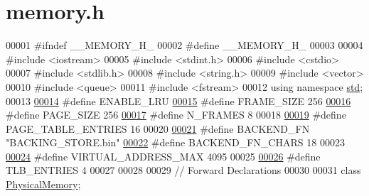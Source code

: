 \hypertarget{memory_8h_source}{}\section{memory.\+h}
\label{memory_8h_source}

\begin{DoxyCode}
00001 \textcolor{preprocessor}{#ifndef \_\_MEMORY\_H\_}
00002 \textcolor{preprocessor}{#define \_\_MEMORY\_H\_}
00003 
00004 \textcolor{preprocessor}{#include <iostream>}
00005 \textcolor{preprocessor}{#include <stdint.h>}
00006 \textcolor{preprocessor}{#include <cstdio>}
00007 \textcolor{preprocessor}{#include <stdlib.h>}
00008 \textcolor{preprocessor}{#include <string.h>}
00009 \textcolor{preprocessor}{#include <vector>}
00010 \textcolor{preprocessor}{#include <queue>}
00011 \textcolor{preprocessor}{#include <fstream>}
00012 \textcolor{keyword}{using namespace }\hyperlink{namespacestd}{std};
00013 
\hypertarget{memory_8h_source.tex_l00014}{}\hyperlink{memory_8h_af6463c112a252cbb29636eef8ae9e6dc}{00014} \textcolor{preprocessor}{#define ENABLE\_LRU}
\hypertarget{memory_8h_source.tex_l00015}{}\hyperlink{memory_8h_af9b1b2ba12857a4bf11289dac8c5462d}{00015} \textcolor{preprocessor}{#define FRAME\_SIZE 256}
\hypertarget{memory_8h_source.tex_l00016}{}\hyperlink{memory_8h_a7d467c1d283fdfa1f2081ba1e0d01b6e}{00016} \textcolor{preprocessor}{#define PAGE\_SIZE 256}
\hypertarget{memory_8h_source.tex_l00017}{}\hyperlink{memory_8h_a0b0ce802de0cae773522024d7626b007}{00017} \textcolor{preprocessor}{#define N\_FRAMES 8}
00018 
\hypertarget{memory_8h_source.tex_l00019}{}\hyperlink{memory_8h_a6fc2e8cefe03a42d0a238bad856a2a8b}{00019} \textcolor{preprocessor}{#define PAGE\_TABLE\_ENTRIES 16}
00020 
\hypertarget{memory_8h_source.tex_l00021}{}\hyperlink{memory_8h_a478707addabe7b0aedaa632b70394d75}{00021} \textcolor{preprocessor}{#define BACKEND\_FN "BACKING\_STORE.bin"}
\hypertarget{memory_8h_source.tex_l00022}{}\hyperlink{memory_8h_a502fddf4e42292e4318a924b6b3b7759}{00022} \textcolor{preprocessor}{#define BACKEND\_FN\_CHARS 18}
00023 
\hypertarget{memory_8h_source.tex_l00024}{}\hyperlink{memory_8h_a391c8595be4da3b3f1cd95918b89da2c}{00024} \textcolor{preprocessor}{#define VIRTUAL\_ADDRESS\_MAX 4095}
00025 
\hypertarget{memory_8h_source.tex_l00026}{}\hyperlink{memory_8h_a49009cc208379999b117ed68da61c759}{00026} \textcolor{preprocessor}{#define TLB\_ENTRIES 4}
00027 
00028 
00029 \textcolor{comment}{// Forward Declarations}
00030 
00031 \textcolor{keyword}{class }\hyperlink{classPhysicalMemory}{PhysicalMemory};

\end{DoxyCode}
